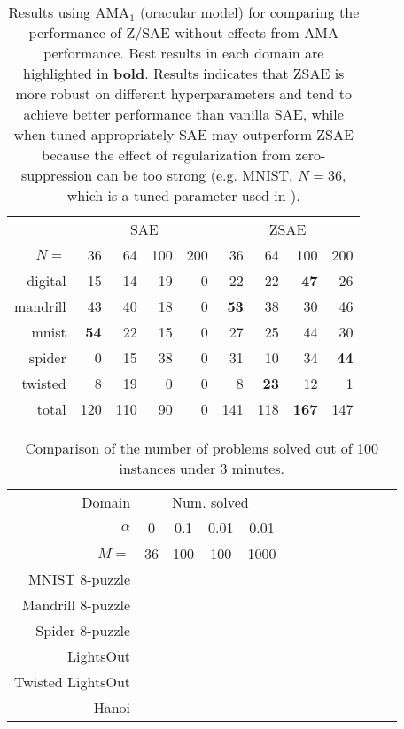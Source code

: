 \begin{table}[htbp]
\centering
{}
\begin{tabular}{|r|rrrr|rrrr|}
\hline
 & \multicolumn{4}{c|}{SAE} & \multicolumn{4}{c|}{ZSAE} \\ 
$N=$ & {36} & {64} & {100} & {200} & {36} & {64} & {100} & {200} \\ \hline
digital & 15 & 14 & 19 & 0 & 22 & 22 & \textbf{47} & 26 \\
mandrill & 43 & 40 & 18 & 0 & \textbf{53} & 38 & 30 & 46 \\
mnist & \textbf{54} & 22 & 15 & 0 & 27 & 25 & 44 & 30 \\
spider & 0 & 15 & 38 & 0 & 31 & 10 & 34 & \textbf{44} \\
twisted & 8 & 19 & 0 & 0 & 8 & \textbf{23} & 12 & 1 \\ \hline
total & {120} & {110} & {90} & {0} & {141} & {118} & \textbf{167} & {147} \\ \hline
\end{tabular}
\caption{Results using AMA$_1$ (oracular model) for comparing the performance of Z/SAE without effects from AMA performance.
Best results in each domain are highlighted in \textbf{bold}.
Results indicates that ZSAE is more robust on different hyperparameters and tend to achieve better performance than vanilla SAE,
while when tuned appropriately SAE may outperform ZSAE because the effect of regularization from zero-suppression can be too strong
(e.g. MNIST, $N=36$, which is a tuned parameter used in \cite{Asai2018}).
}
\label{ama1}
\end{table}



\begin{table}
 \centering
 \begin{tabular}{|r|*{12}{c|}}
  Domain            & \multicolumn{4}{|c|}{Num. solved} \\
  $\alpha$          & 0  & 0.1 & 0.01 & 0.01 \\
  $M=$              & 36 & 100 & 100  & 1000 \\
  MNIST    8-puzzle & & & & \\
  Mandrill 8-puzzle & & & & \\
  Spider   8-puzzle & & & & \\
  LightsOut         & & & & \\
  Twisted LightsOut & & & & \\
  Hanoi             & & & & \\
 \end{tabular}
 \caption{Comparison of the number of problems solved out of 100 instances under 3 minutes.}
 \label{tab:planning}
\end{table}


